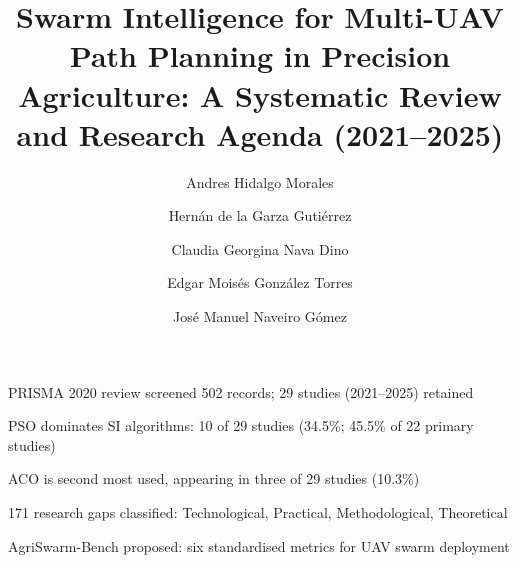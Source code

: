 \documentclass[review,3p]{elsarticle}
\begin{document}
\begin{frontmatter}

\begin{highlights}
\item PRISMA 2020 review screened 502 records; 29 studies (2021--2025) retained
\item PSO dominates SI algorithms: 10 of 29 studies (34.5\%; 45.5\% of 22 primary studies)
\item ACO is second most used, appearing in three of 29 studies (10.3\%)
\item 171 research gaps classified: Technological, Practical, Methodological, Theoretical
\item AgriSwarm-Bench proposed: six standardised metrics for UAV swarm deployment
\end{highlights}

\title{Swarm Intelligence for Multi-UAV Path Planning in Precision Agriculture:
A Systematic Review and Research Agenda (2021--2025)}

\author{\texorpdfstring{Andres Hidalgo Morales}{Andres Hidalgo Morales}}

\author{\texorpdfstring{Hernán de la Garza Gutiérrez}{Hernan de la Garza Gutierrez}}

\author{\texorpdfstring{Claudia Georgina Nava Dino}{Claudia Georgina Nava Dino}}

\author{\texorpdfstring{Edgar Moisés González Torres}{Edgar Moises Gonzalez Torres}}

\author{\texorpdfstring{José Manuel Naveiro Gómez}{Jose Manuel Naveiro Gomez}}



\end{frontmatter}
\end{document}
